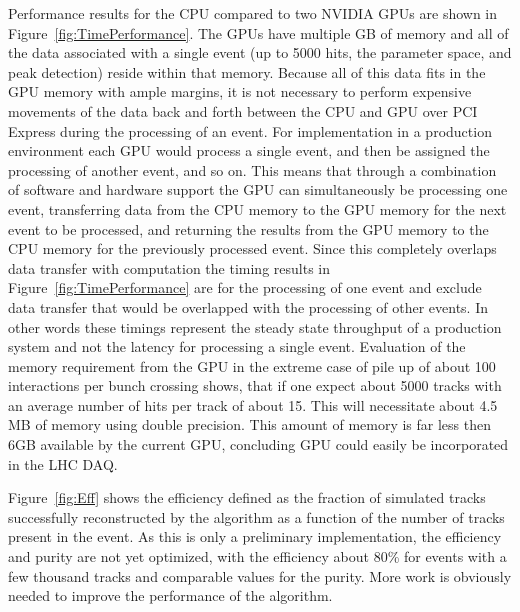 \documentclass{JINST}
\begin{document}
Performance results for the CPU compared to two NVIDIA GPUs are shown in Figure~\ref{fig:TimePerformance}.
The GPUs have multiple GB of memory and all of the data associated with a single event (up to 5000 hits, the
parameter space, and peak detection) reside within that memory.  Because all of this data fits in the GPU
memory with ample margins, it is not necessary to perform expensive movements of the data back and forth
between the CPU and GPU over PCI Express during the processing of an event.  For implementation in a
production environment each GPU would process a single event, and then be assigned the processing of another
event, and so on.  This means that through a combination of software and hardware support the GPU can
simultaneously be processing one event, transferring data from the CPU memory to the GPU memory for the next
event to be processed, and returning the results from the GPU memory to the CPU memory for the previously
processed event.  Since this completely overlaps data transfer with computation the timing results in
Figure~\ref{fig:TimePerformance} are for the processing of one event and exclude data transfer that would be
overlapped with the processing of other events.  In other words these timings represent the steady state
throughput of a production system and not the latency for processing a single event.
Evaluation of the memory requirement from the GPU in the extreme case of pile up of about 100 interactions
 per bunch crossing shows, that if one expect about 5000 tracks with an average number of hits per track of about 15.
This will necessitate about  4.5 MB of memory using double precision. This amount of memory
is far less then 6GB available by the current GPU, concluding GPU could easily be incorporated in the LHC DAQ.


Figure~\ref{fig:Eff} shows the efficiency defined as the fraction of simulated tracks successfully
reconstructed by the algorithm as a function of the number of tracks present in the event. As this is only a preliminary 
implementation, the efficiency and purity are not yet optimized, with the efficiency about 80\% for events with a few 
thousand tracks and comparable values for the purity. More work is obviously needed to improve the performance of the 
algorithm.
\end{document}
